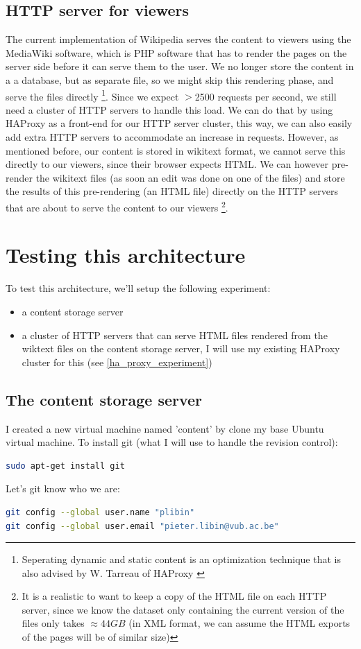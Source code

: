 \documentclass[12pt]{report}
\begin{document}
\subsection{HTTP server for viewers}
The current implementation of Wikipedia serves the content to viewers
using the MediaWiki software, which is PHP software that has to render
the pages on the server side before it can serve them to the user.
We no longer store the content in a a database, but as separate file, so
we might skip this rendering phase, and serve the files directly
\footnote{Seperating dynamic and static content is an optimization
  technique that is also advised by W. Tarreau of HAProxy \cite{haproxy:2013}}. 
Since we expect $>$2500 requests per second, we still need a cluster of
HTTP servers to handle this load. We can do that by using HAProxy as a 
front-end for our HTTP server cluster, this way, we can also easily add
extra HTTP servers to accommodate an increase in requests.
However, as mentioned before, our content is stored in wikitext
format, we cannot serve this directly to our viewers, since their
browser expects HTML. We can however pre-render the wikitext files (as
soon an edit was done on one of the files) and store the results of
this pre-rendering (an HTML file) directly on the HTTP servers that
are about to serve the content to our viewers \footnote{It is a
  realistic to want to keep a copy of the HTML file on each HTTP server,
since we know the dataset only containing the current version of
the files only takes $\approx 44GB$ (in XML format, we can assume the
HTML exports of the pages will be of similar size)}.

\section{Testing this architecture}
To test this architecture, we'll setup the following experiment:
\begin{itemize}
\item a content storage server 
\item a cluster of HTTP servers that can serve HTML files rendered from
the wiktext files on the content storage server, I will use my
existing HAProxy cluster for this (see \cref{ha_proxy_experiment})
\end{itemize}

\subsection{The content storage server}
I created a new virtual machine named 'content' by clone my base
Ubuntu virtual machine.
To install git (what I will use to handle the revision control):
\begin{lstlisting}[language=bash]
sudo apt-get install git
\end{lstlisting}
Let's git know who we are:
\begin{lstlisting}[language=bash]
git config --global user.name "plibin"
git config --global user.email "pieter.libin@vub.ac.be"
\end{lstlisting}
\end{document}

